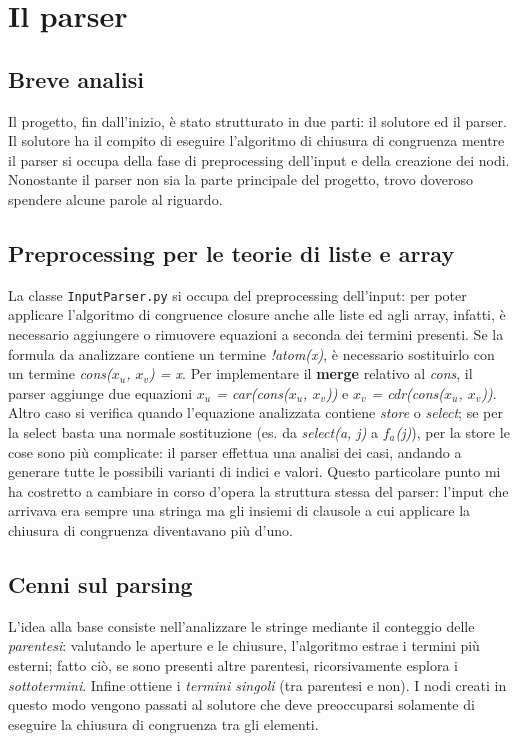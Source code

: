 \chapter{Il parser}
\section{Breve analisi}
Il progetto, fin dall'inizio, è stato strutturato in due parti: il solutore ed il parser. Il solutore ha il compito di
eseguire l'algoritmo di chiusura di congruenza mentre il parser si occupa della fase di preprocessing dell'input e della creazione
dei nodi. Nonostante il parser non sia la parte principale del progetto, trovo doveroso spendere alcune parole al riguardo.
\section{Preprocessing per le teorie di liste e array}
La classe \texttt{InputParser.py} si occupa del preprocessing dell'input: per poter applicare l'algoritmo di congruence
closure anche alle liste ed agli array, infatti, è necessario aggiungere o rimuovere equazioni a seconda dei termini presenti.
Se la formula da analizzare contiene un termine \textit{!atom(x)}, è necessario sostituirlo con un termine
\textit{cons($x_u$, $x_v$) = x}. Per implementare il \textbf{merge} relativo al \textit{cons}, il parser aggiunge due equazioni
\textit{$x_u$ = car(cons($x_u$, $x_v$))} e \textit{$x_v$ = cdr(cons($x_u$, $x_v$))}. Altro caso si verifica quando l'equazione
analizzata contiene \textit{store} o \textit{select}; se per la select basta una normale sostituzione (es. da \textit{select(a, j)}
a \textit{$f_a$(j)}), per la store le cose sono più complicate: il parser effettua una analisi dei casi, andando a generare
tutte le possibili varianti di indici e valori. Questo particolare punto mi ha costretto a cambiare in corso d'opera
la struttura stessa del parser: l'input che arrivava era sempre una stringa ma gli insiemi di clausole a cui applicare la
chiusura di congruenza diventavano più d'uno.
\section{Cenni sul parsing}
L'idea alla base consiste nell'analizzare le stringe mediante il conteggio delle \textit{parentesi}: valutando le aperture
e le chiusure, l'algoritmo estrae i termini più esterni; fatto ciò, se sono presenti altre parentesi, ricorsivamente esplora
i \textit{sottotermini}. Infine ottiene i \textit{termini singoli} (tra parentesi e non). I nodi creati in questo modo
vengono passati al solutore che deve preoccuparsi solamente di eseguire la chiusura di congruenza tra gli elementi.